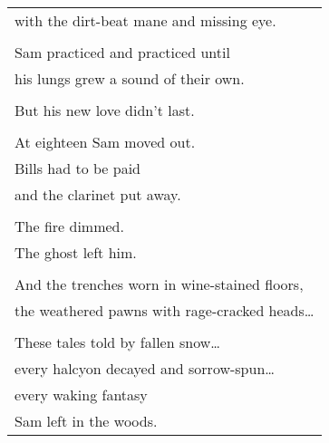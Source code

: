 \documentclass{article}
\begin{document}
\begin{center}
\begin{tabular}{l}
\hspace*{2ex}with the dirt-beat mane and missing eye. \\
\\
\hspace*{2ex}Sam practiced and practiced until \\
\hspace*{2ex}his lungs grew a sound of their own. \\
\\
\hspace*{2ex}But his new love didn't last. \\
\\
\hspace*{2ex}At eighteen Sam moved out. \\
\hspace*{2ex}Bills had to be paid \\
\hspace*{2ex}and the clarinet put away. \\
\\
The fire dimmed. \\
The ghost left him. \\
\\
And the trenches worn in wine-stained floors, \\
the weathered pawns with rage-cracked heads\ldots \\
\\
These tales told by fallen snow\ldots \\
every halcyon decayed and sorrow-spun\ldots \\
every waking fantasy \\
Sam left in the woods. \\
\end{tabular}
\end{center}
\end{document}
